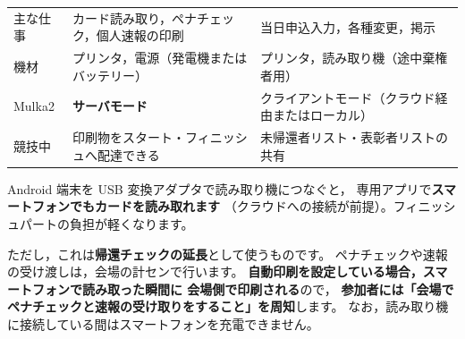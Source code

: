 \begin{center}
\small
\begin{tabular}{@{}P{28mm}P{54mm}P{62mm}@{}}
\toprule
 &  &  \\
\midrule
主な仕事 & カード読み取り，ペナチェック，個人速報の印刷 & 当日申込入力，各種変更，掲示 \\
機材 & プリンタ，電源（発電機またはバッテリー） & プリンタ，読み取り機（途中棄権者用） \\
Mulka2 & \textbf{サーバモード} & クライアントモード（クラウド経由またはローカル） \\
競技中 & 印刷物をスタート・フィニッシュへ配達できる & 未帰還者リスト・表彰者リストの共有 \\
\bottomrule
\end{tabular}
\end{center}

\begin{Note}[スマートフォンでの読み取り]
Android 端末を USB 変換アダプタで読み取り機につなぐと，
専用アプリで\textbf{スマートフォンでもカードを読み取れます}
（クラウドへの接続が前提）。フィニッシュパートの負担が軽くなります。

ただし，これは\textbf{帰還チェックの延長}として使うものです。
ペナチェックや速報の受け渡しは，会場の計センで行います。
\textbf{自動印刷を設定している場合，スマートフォンで読み取った瞬間に
会場側で印刷される}ので，
\textbf{参加者には「会場でペナチェックと速報の受け取りをすること」を周知}します。
なお，読み取り機に接続している間はスマートフォンを充電できません。
\end{Note}
